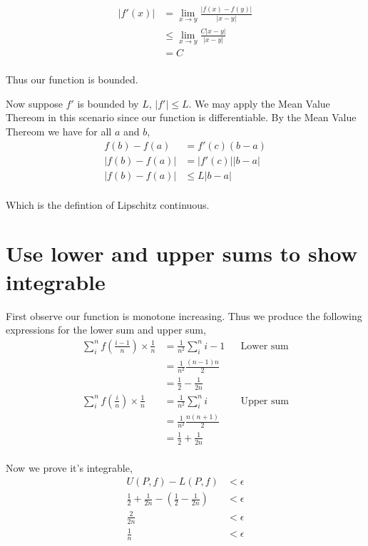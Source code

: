 \documentclass{article}
\begin{document}
\begin{align*}
    |f'(x)| &= \lim_{x \to y} \frac{|f(x) - f(y)|}{|x - y|} \\
    &\leq \lim_{x \to y} \frac{C|x - y|}{|x - y|} \\
    &= C \\
\end{align*}

Thus our function is bounded.

Now suppose $f'$ is bounded by $L$, $|f'| \leq L$.
We may apply the Mean Value Thereom in this scenario since our function is
differentiable. By the Mean Value Thereom we have for all $a$ and $b$,
\begin{align*}
    f(b) - f(a) &= f'(c)(b - a) \\
    |f(b) - f(a)| &= |f'(c)||b - a| \\
    |f(b) - f(a)| &\leq L|b - a| \\
\end{align*}

Which is the defintion of Lipschitz continuous.

\section{Use lower and upper sums to show integrable}
First observe our function is monotone increasing.
Thus we produce the following expressions for the lower sum and upper sum,
\begin{align*}
    \sum_i^n f\left(\frac{i - 1}{n}\right) \times \frac{1}{n}
    &= \frac{1}{n^2} \sum_i^n i-1 && \text{Lower sum} \\
    &= \frac{1}{n^2} \frac{(n-1)n}{2} \\
    &= \frac{1}{2} - \frac{1}{2n} \\

    \sum_i^n f\left(\frac{i}{n}\right) \times \frac{1}{n}
    &= \frac{1}{n^2} \sum_i^n i && \text{Upper sum} \\
    &= \frac{1}{n^2} \frac{n(n+1)}{2} \\
    &= \frac{1}{2} + \frac{1}{2n} \\
\end{align*}

Now we prove it's integrable,
\begin{align*}
    U(P,f) - L(P,f) &< \epsilon \\
    \frac{1}{2} + \frac{1}{2n} - \left(\frac{1}{2} - \frac{1}{2n}\right)
    &< \epsilon \\
    \frac{2}{2n} &< \epsilon \\
    \frac{1}{n} &< \epsilon \\
\end{align*}
\end{document}
